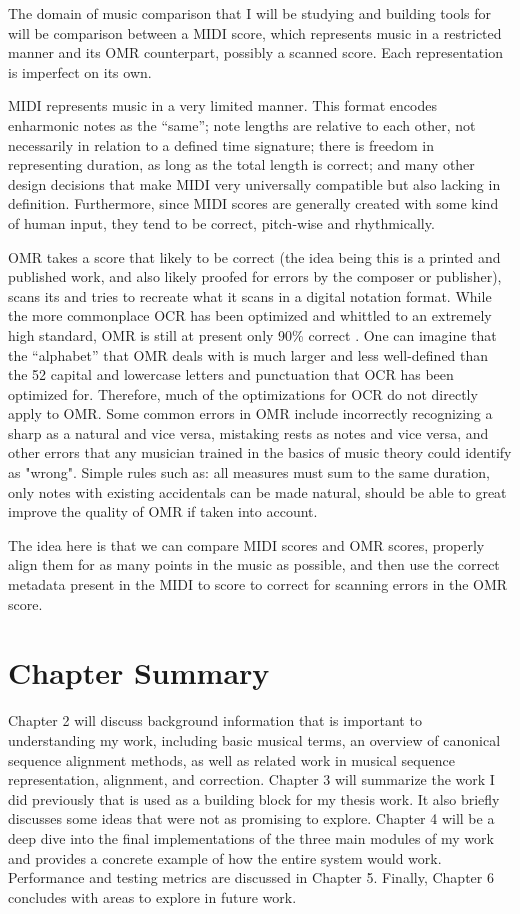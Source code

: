 The domain of music comparison that I will be studying and building tools for will be comparison between a MIDI score, which represents music in a restricted manner and its OMR counterpart, possibly a scanned score. Each representation is imperfect on its own.

MIDI represents music in a very limited manner. This format encodes enharmonic notes as the ``same''; note lengths are relative to each other, not necessarily in relation to a defined time signature; there is freedom in representing duration, as long as the total length is correct; and many other design decisions that make MIDI very universally compatible but also lacking in definition. Furthermore, since MIDI scores are generally created with some kind of human input, they tend to be correct, pitch-wise and rhythmically. 
 
OMR takes a score that likely to be correct (the idea being this is a printed and published work, and also likely proofed for errors by the composer or publisher), scans its and tries to recreate what it scans in a digital notation format. While the more commonplace OCR has been optimized and whittled to an extremely high standard, OMR is still at present only 90\% correct \cite{church}. One can imagine that the ``alphabet'' that OMR deals with is much larger and less well-defined than the 52 capital and lowercase letters and punctuation that OCR has been optimized for. Therefore, much of the optimizations for OCR do not directly apply to OMR. Some common errors in OMR include incorrectly recognizing a sharp as a natural and vice versa, mistaking rests as notes and vice versa, and other errors that any musician trained in the basics of music theory could identify as "wrong". Simple rules such as: all measures must sum to the same duration, only notes with existing accidentals can be made natural, should be able to great improve the quality of OMR if taken into account.

The idea here is that we can compare MIDI scores and OMR scores, properly align them for as many points in the music as possible, and then use the correct metadata present in the MIDI to score to correct for scanning errors in the OMR score. 


\section{Chapter Summary}
Chapter 2 will discuss background information that is important to understanding my work, including basic musical terms, an overview of canonical sequence alignment methods, as well as related work in musical sequence representation, alignment, and correction. Chapter 3 will summarize the work I did previously that is used as a building block for my thesis work. It also briefly discusses some ideas that were not as promising to explore. Chapter 4 will be a deep dive into the final implementations of the three main modules of my work and provides a concrete example of how the entire system would work. Performance and testing metrics are discussed in Chapter 5. Finally, Chapter 6 concludes with areas to explore in future work. 

